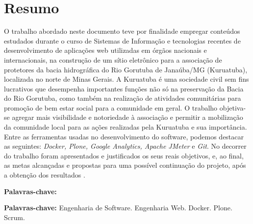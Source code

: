 \chapter*{Resumo}

\vspace{0.4cm}

\noindent O trabalho abordado neste documento teve por finalidade empregar conteúdos estudados durante o curso de Sistemas de Informação e tecnologias recentes de desenvolvimento de aplicações web utilizadas em órgãos nacionais e internacionais, na construção de um sítio eletrônico para a associação de protetores da bacia hidrográfica do Rio Gorutuba de Janaúba/MG (Kuruatuba), localizada no norte de Minas Gerais. A Kuruatuba é uma sociedade civil sem fins lucrativos que desempenha importantes funções não só na preservação da Bacia do Rio Gorutuba, como também na realização de atividades comunitárias para promoção de bem estar social para a comunidade em geral. O trabalho objetiva-se agregar mais visibilidade e notoriedade à associação e permitir a mobilização da comunidade local para as ações realizadas pela Kuruatuba e sua importância.   
Entre as ferramentas usadas no desenvolvimento do software, podemos destacar as seguintes: \textit{Docker, Plone, Google Analytics, Apache JMeter} e \textit{Git}.  
No decorrer do trabalho foram apresentados e justificados os seus reais objetivos, e, ao final, as metas alcançadas e propostas para uma possível continuação do projeto, após a obtenção dos resultados .

\begin{labeling}{\textbf{Palavras-chave:}}
\item[\textbf{Palavras-chave:}] 
Engenharia de Software.
Engenharia Web.
Docker.
Plone.
Scrum.
\end{labeling}

